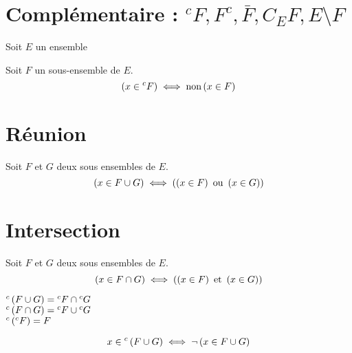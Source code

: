 \documentclass[12pt,twoside,a4paper]{article}
\author{MPSI 2}
\begin{document}
	\maketitle
	\section{Complémentaire : ${^cF},F^c,\bar{F},C_EF,E\setminus F$}
		Soit $E$ un ensemble
		\begin{defi}
			Soit $F$ un sous-ensemble de $E$.\\
			$$\left(x\in{^cF}\right)\iff\text{non}\left(x\in F\right)$$
		\end{defi}
	\section{Réunion}
		\begin{defi}
			Soit $F$ et $G$ deux sous ensembles de $E$.
			$$\left(x\in F\cup G\right)\iff\left(\left(x\in F\right)\text{ ou }\left(x\in G\right)\right)$$
		\end{defi}
	\section{Intersection}
		\begin{defi}
			Soit $F$ et $G$ deux sous ensembles de $E$.
			$$\left(x\in F\cap G\right)\iff\left(\left(x\in F\right)\text{ et }\left(x\in G\right)\right)$$
		\end{defi}
		\begin{prop}
			${^c\left(F\cup G\right)}={^cF}\cap{^cG}$ \\
			${^c\left(F\cap G\right)}={^cF}\cup{^cG}$ \\
			${^c\left(^cF\right)}=F$
		\end{prop}
		\begin{preuve}
			$$\begin{aligned}
				x\in{^c\left(F\cup G\right)}&\iff\neg\left(x\in F\cup G\right) \\
									&
			\end{aligned}$$
		\end{preuve}
\end{document}

